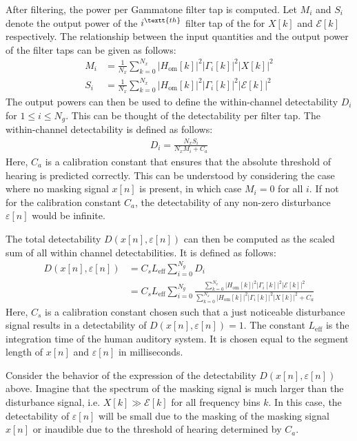 After filtering, the power per Gammatone filter tap is computed.
Let $M_i$ and $S_i$ denote the output power of the $i^\textt{th}$ filter tap of the for $X[k]$ and 
$\mathcal{E}[k]$ respectively.
The relationship between the input quantities and the output power of the filter taps can be given as follows:
\begin{align}
    M_i &= \frac{1}{N_x}\sum_{k=0}^{N_x}\left|H_\text{om}[k]\right|^2\left|\Gamma_i[k]\right|^2\left|X[k]\right|^2 \\
    S_i &= \frac{1}{N_x}\sum_{k=0}^{N_x}\left|H_\text{om}[k]\right|^2\left|\Gamma_i[k]\right|^2\left|\mathcal{E}[k]\right|^2 
\end{align}
The output powers can then be used to define the within-channel detectability $D_i$ for $1 \leq i \leq N_g$.
This can be thought of the detectability per filter tap.
The within-channel detectability is defined as follows:
\begin{align}
    D_i = \frac{N_xS_i}{N_xM_i + C_a}
\end{align}
Here, $C_a$ is a calibration constant that ensures that the absolute threshold of hearing is predicted correctly.
This can be understood by considering the case where no masking signal $x[n]$ is present, 
in which case $M_i = 0$ for all $i$.
If not for the calibration constant $C_a$, the detectability of any non-zero disturbance $\varepsilon[n]$ would be infinite.

The total detectability $D(x[n],\varepsilon[n])$ can then be computed as the scaled sum of all within channel detectabilities.
It is defined as follows:
\begin{align}
    D(x[n],\varepsilon[n]) &= C_s L_\text{eff}\sum_{i=0}^{N_g} D_i \\
                        &= C_s L_\text{eff}\sum_{i=0}^{N_g} 
                        \frac{\sum_{k=0}^{N_x}\left|H_\text{om}[k]\right|^2\left|
                            \Gamma_i[k]\right|^2\left|\mathcal{E}[k]\right|^2}
                        {\sum_{k=0}^{N_x}\left|H_\text{om}[k]\right|^2\left|
                            \Gamma_i[k]\right|^2\left|X[k]\right|^2 + C_a}
\end{align}
Here, $C_s$ is a calibration constant chosen such that a just noticeable disturbance signal results in a 
detectability of $D(x[n],\varepsilon[n]) = 1$. 
The constant $L_\text{eff}$ is the integration time of the human auditory system.
It is chosen equal to the segment length of $x[n]$ and $\varepsilon[n]$ in milliseconds.  

Consider the behavior of the expression of the detectability $D(x[n],\varepsilon[n])$ above.
Imagine that the spectrum of the masking signal is much larger than the disturbance signal, 
i.e. $X[k] \gg \mathcal{E}[k]$ for all frequency bins $k$.
In this case, the detectability of $\varepsilon[n]$ will be small due to the masking of the masking signal $x[n]$ or
inaudible due to the threshold of hearing determined by $C_a$.

